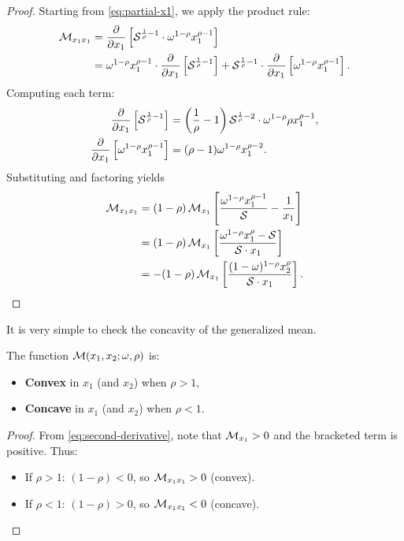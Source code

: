 \begin{proof}
Starting from \cref{eq:partial-x1}, we apply the product rule:
\begin{align*}
\mathcal{M}_{x_1 x_1} &= \frac{\partial}{\partial x_1} \left[ \mathcal{S}^{\frac{1}{\rho}-1} \cdot \omega^{1-\rho} x_1^{\rho-1} \right] \\
&= \omega^{1-\rho} x_1^{\rho-1} \cdot \frac{\partial}{\partial x_1}\left[ \mathcal{S}^{\frac{1}{\rho}-1} \right] 
   + \mathcal{S}^{\frac{1}{\rho}-1} \cdot \frac{\partial}{\partial x_1}\left[ \omega^{1-\rho} x_1^{\rho-1} \right].
\end{align*}
Computing each term:
\begin{align*}
\frac{\partial}{\partial x_1}\left[ \mathcal{S}^{\frac{1}{\rho}-1} \right] 
&= \left(\frac{1}{\rho}-1\right) \mathcal{S}^{\frac{1}{\rho}-2} \cdot \omega^{1-\rho} \rho x_1^{\rho-1}, \\
\frac{\partial}{\partial x_1}\left[ \omega^{1-\rho} x_1^{\rho-1} \right] 
&= (\rho-1) \omega^{1-\rho} x_1^{\rho-2}.
\end{align*}
Substituting and factoring yields
\begin{align*}
\mathcal{M}_{x_1 x_1} &= (1-\rho) \, \mathcal{M}_{x_1} \left[ \frac{\omega^{1-\rho} x_1^{\rho-1}}{\mathcal{S}} - \frac{1}{x_1} \right] \\
&= (1-\rho) \, \mathcal{M}_{x_1} \left[ \frac{\omega^{1-\rho} x_1^\rho - \mathcal{S}}{\mathcal{S} \cdot x_1} \right] \\
&= -(1-\rho) \, \mathcal{M}_{x_1} \left[ \frac{(1-\omega)^{1-\rho} x_2^\rho}{\mathcal{S} \cdot x_1} \right].
\end{align*}
\end{proof}
It is very simple to check the concavity of the generalized mean. 
\begin{proposition}
\label{prop:convexity}
The function $\mathcal{M}(x_1, x_2; \omega, \rho)$ is:
\begin{itemize}[leftmargin=1.5em]
    \item \textbf{Convex} in $x_1$ (and $x_2$) when $\rho > 1$,
    \item \textbf{Concave} in $x_1$ (and $x_2$) when $\rho < 1$.
\end{itemize}
\end{proposition}

\begin{proof}
From \cref{eq:second-derivative}, note that $\mathcal{M}_{x_1} > 0$ and the bracketed term is positive. Thus:
\begin{itemize}[leftmargin=1.5em]
    \item If $\rho > 1$: $(1-\rho) < 0$, so $\mathcal{M}_{x_1 x_1} > 0$ (convex).
    \item If $\rho < 1$: $(1-\rho) > 0$, so $\mathcal{M}_{x_1 x_1} < 0$ (concave).
\end{itemize}
\end{proof}

